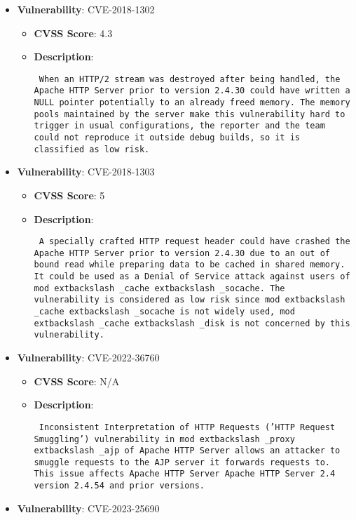 \documentclass{article}
\begin{document}
\begin{itemize}
        \item \textbf{Vulnerability}: CVE-2018-1302
        \begin{itemize}
            \item \textbf{CVSS Score}:  4.3 
            \item \textbf{Description}: \parbox{\linewidth}{\texttt{ When an HTTP/2 stream was destroyed after being handled, the Apache HTTP Server prior to version 2.4.30 could have written a NULL pointer potentially to an already freed memory. The memory pools maintained by the server make this vulnerability hard to trigger in usual configurations, the reporter and the team could not reproduce it outside debug builds, so it is classified as low risk. }}
        \end{itemize}
    
        \item \textbf{Vulnerability}: CVE-2018-1303
        \begin{itemize}
            \item \textbf{CVSS Score}:  5 
            \item \textbf{Description}: \parbox{\linewidth}{\texttt{ A specially crafted HTTP request header could have crashed the Apache HTTP Server prior to version 2.4.30 due to an out of bound read while preparing data to be cached in shared memory. It could be used as a Denial of Service attack against users of mod	extbackslash _cache	extbackslash _socache. The vulnerability is considered as low risk since mod	extbackslash _cache	extbackslash _socache is not widely used, mod	extbackslash _cache	extbackslash _disk is not concerned by this vulnerability. }}
        \end{itemize}
    
        \item \textbf{Vulnerability}: CVE-2022-36760
        \begin{itemize}
            \item \textbf{CVSS Score}:  N/A 
            \item \textbf{Description}: \parbox{\linewidth}{\texttt{ Inconsistent Interpretation of HTTP Requests ('HTTP Request Smuggling') vulnerability in mod	extbackslash _proxy	extbackslash _ajp of Apache HTTP Server allows an attacker to smuggle requests to the AJP server it forwards requests to.  This issue affects Apache HTTP Server Apache HTTP Server 2.4 version 2.4.54 and prior versions. }}
        \end{itemize}
    
        \item \textbf{Vulnerability}: CVE-2023-25690
\end{itemize}
\end{document}
